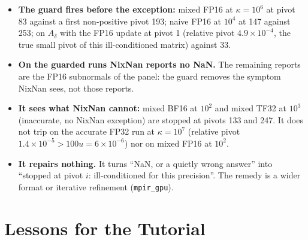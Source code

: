\documentclass[11pt,a4paper]{article}
\begin{document}
\begin{itemize}
  \item \textbf{The guard fires before the exception:} mixed FP16 at $\kappa=10^{6}$ at pivot 83 against a first non-positive pivot 193; naive FP16 at $10^{4}$ at 147 against 253; on $A_\delta$ with the FP16 update at pivot 1 (relative pivot $4.9\times10^{-4}$, the true small pivot of this ill-conditioned matrix) against 33.
  \item \textbf{On the guarded runs NixNan reports no NaN.} The remaining reports are the FP16 subnormals of the panel: the guard removes the symptom NixNan sees, not those reports.
  \item \textbf{It sees what NixNan cannot:} mixed BF16 at $10^{2}$ and mixed TF32 at $10^{3}$ (inaccurate, no NixNan exception) are stopped at pivots 133 and 247. It does not trip on the accurate FP32 run at $\kappa=10^{7}$ (relative pivot $1.4\times10^{-5}>100u=6\times10^{-6}$) nor on mixed FP16 at $10^{2}$.
  \item \textbf{It repairs nothing.} It turns ``NaN, or a quietly wrong answer'' into ``stopped at pivot $i$: ill-conditioned for this precision''. The remedy is a wider format or iterative refinement (\texttt{mpir\_gpu}).
\end{itemize}

\section{Lessons for the Tutorial}
\end{document}

